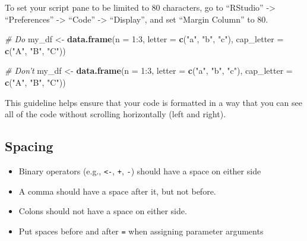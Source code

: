 \documentclass[]{book}
\makeatletter
\newenvironment{Shaded}{\begin{snugshade}}{\end{snugshade}}
\newcommand{\KeywordTok}[1]{\textcolor[rgb]{0.13,0.29,0.53}{\textbf{{#1}}}}
\newcommand{\DataTypeTok}[1]{\textcolor[rgb]{0.13,0.29,0.53}{{#1}}}
\newcommand{\DecValTok}[1]{\textcolor[rgb]{0.00,0.00,0.81}{{#1}}}
\newcommand{\StringTok}[1]{\textcolor[rgb]{0.31,0.60,0.02}{{#1}}}
\newcommand{\CommentTok}[1]{\textcolor[rgb]{0.56,0.35,0.01}{\textit{{#1}}}}
\newcommand{\NormalTok}[1]{{#1}}
\providecommand{\tightlist}{%
  \setlength{\itemsep}{0pt}\setlength{\parskip}{0pt}}
\newenvironment{kframe}{%
\medskip{}
\setlength{\fboxsep}{.8em}
 \def\at@end@of@kframe{}%
 \ifinner\ifhmode%
  \def\at@end@of@kframe{\end{minipage}}%
  \begin{minipage}{\columnwidth}%
 \fi\fi%
 \def\FrameCommand##1{\hskip\@totalleftmargin \hskip-\fboxsep
 \colorbox{shadecolor}{##1}\hskip-\fboxsep
     \hskip-\linewidth \hskip-\@totalleftmargin \hskip\columnwidth}%
 \MakeFramed {\advance\hsize-\width
   \@totalleftmargin\z@ \linewidth\hsize
   \@setminipage}}%
 {\par\unskip\endMakeFramed%
 \at@end@of@kframe}
\renewenvironment{Shaded}{\begin{kframe}}{\end{kframe}}
\makeatother
\begin{document}
To set your script pane to be limited to 80 characters, go to
``RStudio'' -\textgreater{} ``Preferences'' -\textgreater{} ``Code''
-\textgreater{} ``Display'', and set ``Margin Column'' to 80.

\begin{Shaded}
\begin{Highlighting}[]
\CommentTok{# Do}
\NormalTok{my_df <-}\StringTok{ }\KeywordTok{data.frame}\NormalTok{(}\DataTypeTok{n =} \DecValTok{1}\NormalTok{:}\DecValTok{3}\NormalTok{,}
                    \DataTypeTok{letter =} \KeywordTok{c}\NormalTok{(}\StringTok{"a"}\NormalTok{, }\StringTok{"b"}\NormalTok{, }\StringTok{"c"}\NormalTok{),}
                    \DataTypeTok{cap_letter =} \KeywordTok{c}\NormalTok{(}\StringTok{"A"}\NormalTok{, }\StringTok{"B"}\NormalTok{, }\StringTok{"C"}\NormalTok{))}

\CommentTok{# Don't}
\NormalTok{my_df <-}\StringTok{ }\KeywordTok{data.frame}\NormalTok{(}\DataTypeTok{n =} \DecValTok{1}\NormalTok{:}\DecValTok{3}\NormalTok{, }\DataTypeTok{letter =} \KeywordTok{c}\NormalTok{(}\StringTok{"a"}\NormalTok{, }\StringTok{"b"}\NormalTok{, }\StringTok{"c"}\NormalTok{), }\DataTypeTok{cap_letter =} \KeywordTok{c}\NormalTok{(}\StringTok{"A"}\NormalTok{, }\StringTok{"B"}\NormalTok{, }\StringTok{"C"}\NormalTok{))}
\end{Highlighting}
\end{Shaded}

This guideline helps ensure that your code is formatted in a way that
you can see all of the code without scrolling horizontally (left and
right).

\subsection{Spacing}\label{spacing}

\begin{itemize}
\tightlist
\item
  Binary operators (e.g., \texttt{\textless{}-}, \texttt{+}, \texttt{-})
  should have a space on either side
\item
  A comma should have a space after it, but not before.
\item
  Colons should not have a space on either side.
\item
  Put spaces before and after \texttt{=} when assigning parameter
  arguments
\end{itemize}
\end{document}
